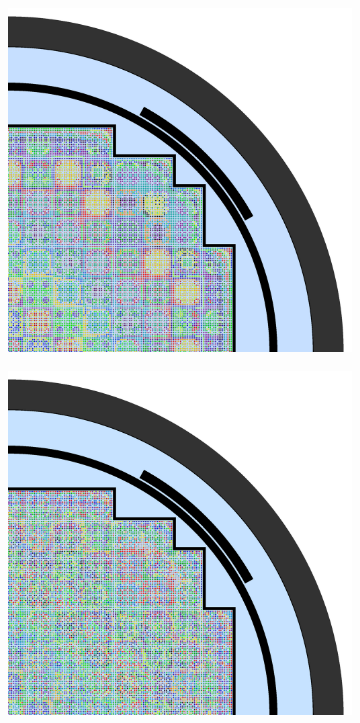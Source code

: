 \begin{appendices}
\begin{figure}[h!]
\begin{subfigure}{0.48\textwidth}
  \centering
  \includegraphics[width=0.85\linewidth]{figures/unsupervised/geometries/without-features/32-clusters/combined/full-core}
  \caption{}
  \label{fig:no-features-full-core-combined-32}
\end{subfigure}
\begin{subfigure}{0.48\textwidth}
  \centering
  \includegraphics[width=0.85\linewidth]{figures/unsupervised/geometries/without-features/64-clusters/pinch/full-core}

\end{subfigure}
\end{figure}
\end{appendices}

